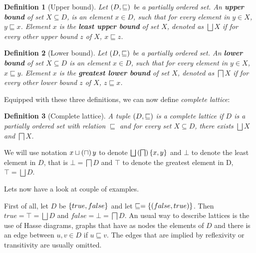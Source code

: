 \documentclass[..thesis.tex]{subfiles}
\newtheorem{defin}{Definition}[section]
\begin{document}
\begin{defin}[Upper bound]
Let $\left( D, \sqsubseteq \right)$ be a partially ordered set. An \textbf{upper bound} of set $X \subseteq D$,  is an element $x \in D$, such that for every element in $y \in X$, $y \sqsubseteq x$. Element $x$ is the \textbf{least upper bound} of set $X$, denoted as $\bigsqcup X$ if for every other upper bound $z$ of $X$, $x \sqsubseteq z$.  
\end{defin}

\begin{defin}[Lower bound]
Let $\left( D, \sqsubseteq \right)$ be a partially ordered set. An \textbf{lower bound} of set $X \subseteq D$  is an element $x \in D$, such that for every element in $y \in X$, $x \sqsubseteq y$. Element $x$ is the \textbf{greatest lower bound} of set $X$, denoted as $\bigsqcap X$ if for every other lower bound $z$ of $X$, $z \sqsubseteq x$.    
\end{defin}

Equipped with these three definitions, we can now define \textit{complete lattice}:

\begin{defin}[Complete lattice]
A tuple $\left( D, \sqsubseteq \right)$ is a complete lattice if $D$ is a partially ordered set with relation $\sqsubseteq$ and for every set $X \subseteq D$, there exists $\bigsqcup X$ and $\bigsqcap X$.
\end{defin}


We will use notation $x \sqcup \left(  \sqcap \right) y$ to denote $\bigsqcup \lp \bigsqcap \rp \lb x, y \rb$ and $\bot$ to denote the least element in $D$, that is $\bot = \bigsqcap D$ and $\top$ to denote the greatest element in D, $\top = \bigsqcup D$.


Lets now have a look at couple of examples. 

First of all, let $D$ be $\left\lbrace true, false \right\rbrace$ and let $\sqsubseteq = \left\lbrace \left( false, true \right) \right\rbrace$. Then $true = \top = \bigsqcup D$ and $false = \bot = \bigsqcap D$. An usual way to describe lattices is the use of Hasse diagrams, graphs that have as nodes the elements of $D$ and there is an edge between $u, v \in D$ if $u \sqsubseteq v$. The edges that are implied by reflexivity or transitivity are usually omitted.
\end{document}

